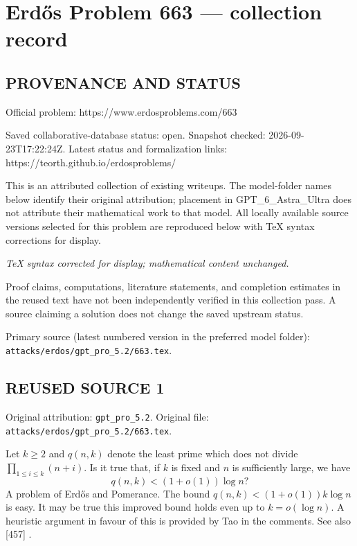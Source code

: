 \section*{Erd\H{o}s Problem 663 --- collection record}

\subsection*{PROVENANCE AND STATUS}
Official problem: https://www.erdosproblems.com/663

Saved collaborative-database status: open.
Snapshot checked: 2026-09-23T17:22:24Z.
Latest status and formalization links: https://teorth.github.io/erdosproblems/

This is an attributed collection of existing writeups. The model-folder names below identify their original attribution; placement in GPT\_6\_Astra\_Ultra does not attribute their mathematical work to that model. All locally available source versions selected for this problem are reproduced below with TeX syntax corrections for display.

\emph{TeX syntax corrected for display; mathematical content unchanged.}

Proof claims, computations, literature statements, and completion estimates in the reused text have not been independently verified in this collection pass. A source claiming a solution does not change the saved upstream status.

Primary source (latest numbered version in the preferred model folder): \texttt{attacks/erdos/gpt\_pro\_5.2/663.tex}.

\subsection*{REUSED SOURCE 1}
Original attribution: \texttt{gpt\_pro\_5.2}.
Original file: \texttt{attacks/erdos/gpt\_pro\_5.2/663.tex}.


Let $k\geq 2$ and $q(n,k)$ denote the least prime which does not divide $\prod_{1\leq i\leq k}(n+i)$. Is it true that, if $k$ is fixed and $n$ is sufficiently large, we have\[q(n,k)<(1+o(1))\log n?\] A problem of Erd\H{o}s and Pomerance. The bound $q(n,k)<(1+o(1))k\log n$ is easy. It may be true this improved bound holds even up to $k=o(\log n)$. A heuristic argument in favour of this is provided by Tao in the comments. See also [457] .


